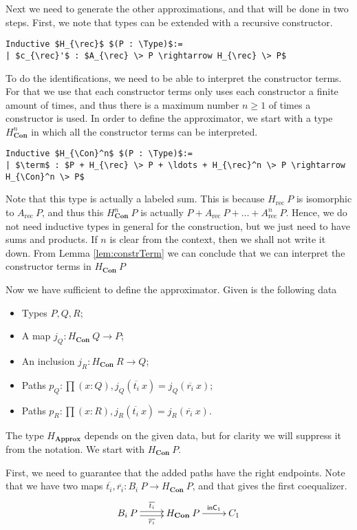 \documentclass[a4paper,UKenglish]{lipics-v2016}
\newcommand{\Boperator}[1]{\mathsf{#1}}
\newcommand{\rec}[0]{\operatorname{rec}}
\newcommand{\term}[0]{\textbf{term}}
\newcommand{\Con}[0]{\textbf{Con}}
\newcommand{\Approx}[0]{\textbf{Approx}}
\newcommand{\inC}[0]{\Boperator{inC}}
\newcommand{\Type}[0]{\operatorname{\textsc{Type}}}
\begin{document}
Next we need to generate the other approximations, and that will be done in two steps.
First, we note that types can be extended with a recursive constructor.
\lstset{language=Coq}
\begin{lstlisting}
Inductive $H_{\rec}$ $(P : \Type)$:=
| $c_{\rec}'$ : $A_{\rec} \> P \rightarrow H_{\rec} \> P$
\end{lstlisting}
To do the identifications, we need to be able to interpret the constructor terms.
For that we use that each constructor terms only uses each constructor  a finite amount of times, and thus there is a maximum number $n \geq 1$ of times a constructor is used.
In order to define the approximator, we start with a type $H_{\Con}^n$ in which all the constructor terms can be interpreted.
\lstset{language=Coq}
\begin{lstlisting}
Inductive $H_{\Con}^n$ $(P : \Type)$:=
| $\term$ : $P + H_{\rec} \> P + \ldots + H_{\rec}^n \> P \rightarrow H_{\Con}^n \> P$
\end{lstlisting}

Note that this type is actually a labeled sum.
This is because $H_{\rec} \> P$ is isomorphic to $A_{\rec} \> P$, and thus this $H_{\Con}^n \> P$ is actually $P + A_{\rec} \> P + \ldots + A_{\rec}^n \> P$.
Hence, we do not need inductive types in general for the construction, but we just need to have sums and products.
If $n$ is clear from the context, then we shall not write it down.
From Lemma \ref{lem:constrTerm} we can conclude that we can interpret the constructor terms in $H_{\Con} \> P$

Now we have sufficient to define the approximator.
Given is the following data
\begin{itemize}
        \item Types $P, Q, R$;
        \item A map $j_Q : H_{\Con} \> Q \rightarrow P$;
        \item An inclusion $j_R : H_{\Con} \> R \rightarrow Q$;
        \item Paths $p_Q : \prod (x : Q), j_Q(\overline{t_i} \> x) = j_Q(\overline{r_i} \> x)$;
        \item Paths $p_R : \prod (x : R), j_R(\overline{t_i} \> x) = j_R(\overline{r_i} \> x)$.
\end{itemize}
The type $H_{\Approx}$ depends on the given data, but for clarity we will suppress it from the notation.
We start with $H_{\Con} \> P$.

First, we need to guarantee that the added paths have the right endpoints.
Note that we have two maps $\overline{t_i}, \overline{r_i} : B_i \> P \rightarrow H_{\Con} \> P$, and that gives the first coequalizer.
\[
\xymatrix
{
        B_i \> P \ar@<-.5ex>[r]_-{\overline{r_i}} \ar@<.5ex>[r]^-{\overline{t_i}} & H_{\Con} \> P \ar[r]^-{\inC_1} & C_1
}
\]
\end{document}
